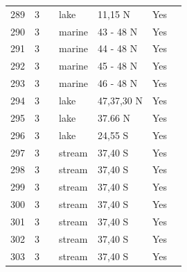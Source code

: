 \documentclass[12pt]{article}
\begin{document}
\begin{landscape}
\begin{table}[h!]
{\begin{tabular}{p{2.8cm}p{1.3cm}p{5.5cm}p{2.2cm}p{2.5cm}lp{3.5cm}}
        289   & 3 & \citet{Fetahi2011}  & lake  & 11,15 N & Yes   &       \\
        290   & 3 & \citet{Brodeur1992}    & marine & 43 - 48 N & Yes   &       \\
        291   & 3 & \citet{Brodeur1992}    & marine & 44 - 48 N & Yes   &       \\
        292   & 3 & \citet{Brodeur1992}    & marine & 45 - 48 N & Yes   &       \\
        293   & 3 & \citet{Brodeur1992}    & marine & 46 - 48 N & Yes   &       \\
        294   & 3 & \citet{Gaedke1994}  & lake  & 47,37,30 N & Yes   &       \\
        295   & 3 & \citet{Preston2012}    & lake  & 37.66 N & Yes   &        \\
        296   & 3 & \citet{Ratsirarson1996}  & lake  & 24,55 S & Yes   &       \\
        297   & 3 & \citet{Closs1994}  & stream & 37,40 S & Yes   &       \\
        298   & 3 & \citet{Closs1994}  & stream & 37,40 S & Yes   &       \\
        299   & 3 & \citet{Closs1994}  & stream & 37,40 S & Yes   &       \\
        300   & 3 & \citet{Closs1994}  & stream & 37,40 S & Yes   &       \\
        301   & 3 & \citet{Closs1994}  & stream & 37,40 S & Yes   &       \\
        302   & 3 & \citet{Closs1994}  & stream & 37,40 S & Yes   &       \\
        303   & 3 & \citet{Closs1994}  & stream & 37,40 S & Yes   &       \\
         \hline
      \end{tabular}}%
      \end{table}

        \newpage


\end{landscape}
\end{document}
